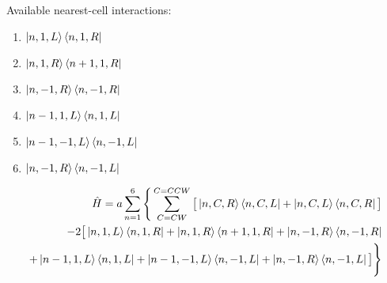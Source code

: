 \documentclass{article}
\begin{document}
Available nearest-cell interactions:
\begin{enumerate}
    \item $\ket{n,1,L}\bra{n,1,R}$
    \item $\ket{n,1,R}\bra{n+1,1,R}$
    \item $\ket{n,-1,R}\bra{n,-1,R}$
    \item $\ket{n-1,1,L}\bra{n,1,L}$
    \item $\ket{n-1,-1,L}\bra{n,-1,L}$
    \item $\ket{n,-1,R}\bra{n,-1,L}$
\end{enumerate}
\begin{equation}
\begin{split}
 \hat{H} = a \sum_{n=1}^{6}\Bigg\{ \sum_{C=CW}^{C=CCW}\big[\ket{n,C,R}\bra{n,C,L} + \ket{n,C,L}\bra{n,C,R}\big] \\
 -2 \big[ \ket{n,1,L}\bra{n,1,R} + \ket{n,1,R}\bra{n+1,1,R} + \ket{n,-1,R}\bra{n,-1,R} \\
+ \ket{n-1,1,L}\bra{n,1,L} + \ket{n-1,-1,L}\bra{n,-1,L} + \ket{n,-1,R}\bra{n,-1,L}\big] \Bigg\}
\end{split}
\end{equation}
\end{document}
